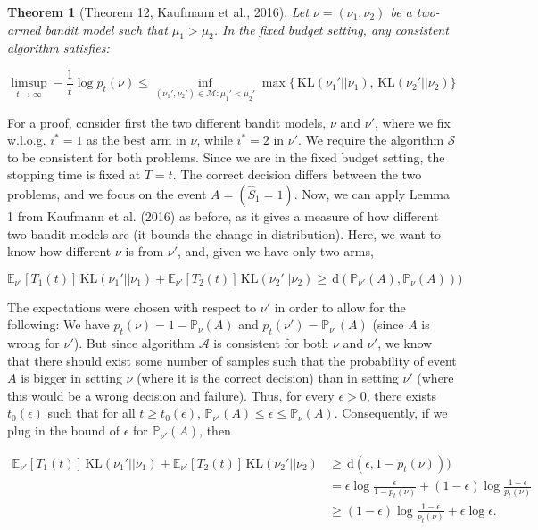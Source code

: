 \documentclass[11pt,]{article}
\newtheorem{theorem}{Theorem}
\newcommand{\KL}{\,\text{KL}}
\newcommand{\der}{\,\text{d}}
\begin{document}
\begin{theorem}[Theorem 12, Kaufmann et al., 2016] \label{theorem:KaufmannEtAlTheorem12}
Let $\nu = (\nu_1, \nu_2)$ be a two-armed bandit model such that $\mu_1 > \mu_2$. In the fixed budget setting, any consistent algorithm satisfies:

\begin{equation*}
\limsup_{t \to \infty} - \frac{1}{t} \log p_t(\nu) \leq \inf_{(\nu_1', \nu_2') \in \mathcal{M}: \mu_1' < \mu_2'} \max \big\{\KL(\nu_1' || \nu_1), \KL(\nu_2' || \nu_2)\big\}
\end{equation*}
\end{theorem}

For a proof, consider first the two different bandit models, \(\nu\) and
\(\nu'\), where we fix w.l.o.g. \(i^* = 1\) as the best arm in \(\nu\),
while \(i^* = 2\) in \(\nu'\). We require the algorithm \(\mathcal{S}\)
to be consistent for both problems. Since we are in the fixed budget
setting, the stopping time is fixed at \(T = t\). The correct decision
differs between the two problems, and we focus on the event
\(A = (\hat{S}_1 = 1)\). Now, we can apply Lemma 1 from Kaufmann et al.
(2016) as before, as it gives a measure of how different two bandit
models are (it bounds the change in distribution). Here, we want to know
how different \(\nu\) is from \(\nu'\), and, given we have only two
arms,

\begin{equation*}
\mathbb{E}_{\nu'}[T_1(t)]\KL(\nu_1'|| \nu_1) + \mathbb{E}_{\nu'}[T_2(t)]\KL(\nu_2'|| \nu_2) \geq \der(\mathbb{P}_{\nu'}(A),\mathbb{P}_{\nu}(A)))
\end{equation*}

The expectations were chosen with respect to \(\nu'\) in order to allow
for the following: We have \(p_t(\nu) = 1 - \mathbb{P}_{\nu}(A)\) and
\(p_t(\nu') = \mathbb{P}_{\nu'}(A)\) (since \(A\) is wrong for
\(\nu'\)). But since algorithm \(\mathcal{A}\) is consistent for both
\(\nu\) and \(\nu'\), we know that there should exist some number of
samples such that the probability of event \(A\) is bigger in setting
\(\nu\) (where it is the correct decision) than in setting \(\nu'\)
(where this would be a wrong decision and failure). Thus, for every
\(\epsilon > 0\), there exists \(t_0(\epsilon)\) such that for all
\(t \geq t_0(\epsilon)\),
\(\mathbb{P}_{\nu'}(A) \leq \epsilon \leq \mathbb{P}_\nu(A)\).
Consequently, if we plug in the bound of \(\epsilon\) for
\(\mathbb{P}_{\nu'}(A)\), then

\begin{align*}
\mathbb{E}_{\nu'}[T_1(t)]\KL(\nu_1' || \nu_1) + \mathbb{E}_{\nu'}[T_2(t)]\KL(\nu_2' || \nu_2) & \geq \der(\epsilon,1-p_t(\nu))) \\
& = \epsilon \log \frac{\epsilon}{1-p_t(\nu)} + (1-\epsilon) \log \frac{1-\epsilon}{p_t(\nu)} \\
& \geq (1-\epsilon) \log \frac{1-\epsilon}{p_t(\nu)} + \epsilon \log \epsilon.
\end{align*}
\end{document}
